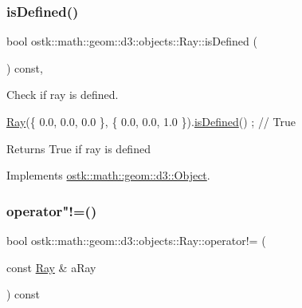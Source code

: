 \subsubsection{\texorpdfstring{is\+Defined()}{isDefined()}}
{\footnotesize\ttfamily bool ostk\+::math\+::geom\+::d3\+::objects\+::\+Ray\+::is\+Defined (\begin{DoxyParamCaption}{ }\end{DoxyParamCaption}) const\hspace{0.3cm}{\ttfamily [override]}, {\ttfamily [virtual]}}



Check if ray is defined. 


\begin{DoxyCode}
\hyperlink{classostk_1_1math_1_1geom_1_1d3_1_1objects_1_1_ray_a78335698f8a4f72e613e607b13121df0}{Ray}(\{ 0.0, 0.0, 0.0 \}, \{ 0.0, 0.0, 1.0 \}).\hyperlink{classostk_1_1math_1_1geom_1_1d3_1_1objects_1_1_ray_ac0d991765b5d91a978fda87696b8069d}{isDefined}() ; \textcolor{comment}{// True}
\end{DoxyCode}


\begin{DoxyReturn}{Returns}
True if ray is defined 
\end{DoxyReturn}


Implements \hyperlink{classostk_1_1math_1_1geom_1_1d3_1_1_object_a271a1964cd208be85ce9a0a429395ad8}{ostk\+::math\+::geom\+::d3\+::\+Object}.

\mbox{\label{classostk_1_1math_1_1geom_1_1d3_1_1objects_1_1_ray_a9167ca5a0a3ad5a8c5e156231838aef3}} 
\subsubsection{\texorpdfstring{operator"!=()}{operator!=()}}
{\footnotesize\ttfamily bool ostk\+::math\+::geom\+::d3\+::objects\+::\+Ray\+::operator!= (\begin{DoxyParamCaption}\item[{const \hyperlink{classostk_1_1math_1_1geom_1_1d3_1_1objects_1_1_ray}{Ray} \&}]{a\+Ray }\end{DoxyParamCaption}) const}



